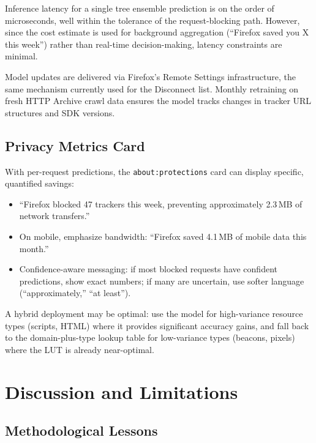 \documentclass[11pt]{article}
\begin{document}
Inference latency for a single tree ensemble prediction is on the order of microseconds, well within the tolerance of the request-blocking path. However, since the cost estimate is used for background aggregation (``Firefox saved you X this week'') rather than real-time decision-making, latency constraints are minimal.

Model updates are delivered via Firefox's Remote Settings infrastructure, the same mechanism currently used for the Disconnect list. Monthly retraining on fresh HTTP Archive crawl data ensures the model tracks changes in tracker URL structures and SDK versions.

\subsection{Privacy Metrics Card}

With per-request predictions, the \texttt{about:protections} card can display specific, quantified savings:

\begin{itemize}
    \item ``Firefox blocked 47 trackers this week, preventing approximately 2.3\,MB of network transfers.''
    \item On mobile, emphasize bandwidth: ``Firefox saved 4.1\,MB of mobile data this month.''
    \item Confidence-aware messaging: if most blocked requests have confident predictions, show exact numbers; if many are uncertain, use softer language (``approximately,'' ``at least'').
\end{itemize}

A hybrid deployment may be optimal: use the model for high-variance resource types (scripts, HTML) where it provides significant accuracy gains, and fall back to the domain-plus-type lookup table for low-variance types (beacons, pixels) where the LUT is already near-optimal.


\section{Discussion and Limitations}
\label{sec:discussion}

\subsection{Methodological Lessons}
\end{document}
